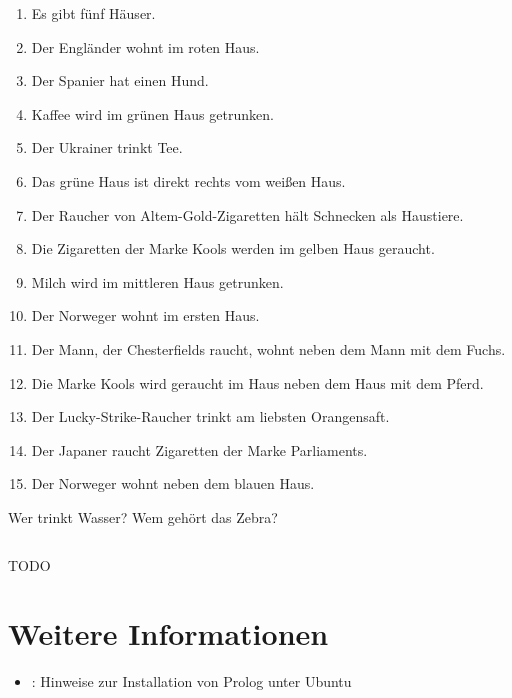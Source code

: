 \begin{enumerate}
    \item Es gibt fünf Häuser.
    \item Der Engländer wohnt im roten Haus.
    \item Der Spanier hat einen Hund.
    \item Kaffee wird im grünen Haus getrunken.
    \item Der Ukrainer trinkt Tee.
    \item Das grüne Haus ist direkt rechts vom weißen Haus.
    \item Der Raucher von Altem-Gold-Zigaretten hält Schnecken als Haustiere.
    \item Die Zigaretten der Marke Kools werden im gelben Haus geraucht.
    \item Milch wird im mittleren Haus getrunken.
    \item Der Norweger wohnt im ersten Haus.
    \item Der Mann, der Chesterfields raucht, wohnt neben dem Mann mit dem Fuchs.
    \item Die Marke Kools wird geraucht im Haus neben dem Haus mit dem Pferd.
    \item Der Lucky-Strike-Raucher trinkt am liebsten Orangensaft.
    \item Der Japaner raucht Zigaretten der Marke Parliaments.
    \item Der Norweger wohnt neben dem blauen Haus.
\end{enumerate}

Wer trinkt Wasser? Wem gehört das Zebra?

\inputminted[linenos, numbersep=5pt, tabsize=4, frame=lines, label=zebraraetsel.pro]{prolog}{scripts/prolog/zebraraetsel.pro}

TODO

\section{Weitere Informationen}
\begin{itemize}
    \item \href{http://wiki.ubuntuusers.de/Prolog}{}: Hinweise zur Installation von Prolog unter Ubuntu
\end{itemize}
